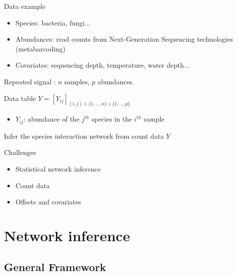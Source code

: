 \documentclass[aspectratio=169]{beamer}
\newcommand{\emphase}[1]{\textcolor{Complement}{#1}}
\begin{document}
\begin{frame}{Data example}
	\begin{itemize}
	\item \emphase{Species}: bacteria, fungi...
	\item \emphase{Abundances}: read counts from Next-Generation Sequencing technologies (metabarcoding)
	\item \emphase{Covariates}: sequencing depth, temperature, water depth...  \bigskip
	
\end{itemize}
	Repeated signal : $n$ samples, $p$ abundances.
\begin{block}{Data table}
	$Y = [Y_{ij}]_{(i,j) \in \{1,...,n\} \times \{1,..., p\}} $
	\begin{itemize}
	\item $Y_{ij}$: abundance of the $j^{th}$ species in the $i^{th}$ sample
\end{itemize}
\end{block}
\begin{center}
	Infer the \emphase{species interaction network} from count data $Y$
\end{center}
\end{frame}
\begin{frame}{Challenges}\large{
	\begin{itemize}
	\item  Statistical network inference \bigskip\bigskip
	\item Count data \bigskip\bigskip
	\item Offsets and covariates
\end{itemize}}
\end{frame}

\section{Network inference}
\subsection{General Framework}
\end{document}
